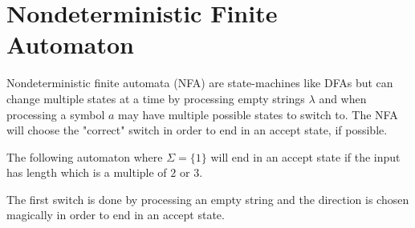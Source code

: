 \documentclass{article}
\newcommand{\emptyString}{\lambda}
\begin{document}
\pagebreak

\section{Nondeterministic Finite Automaton}

Nondeterministic finite automata (NFA) are state-machines
like DFAs but can change multiple states at a time by processing
empty strings \(\emptyString\) and when processing a symbol
\(a\) may have multiple possible states to switch to.
The NFA will choose the "correct" switch in order to end in an accept state, if possible.

The following automaton where \(\Sigma = \{1\}\) will end in an accept state
if the input has length which is a multiple of \(2\) or \(3\).

\newcommand\double[3][10]{%
  \draw (#2)
    edge [bend left=#1,draw=none]
    coordinate[at start](#2-#3-s)
    coordinate[at end](#2-#3-e)
    (#3)
    edge [bend right=#1,draw=none]
    coordinate[at start](#3-#2-e)
    coordinate[at end](#3-#2-s)
    (#3);
}

\begin{center}
\end{center}
The first switch is done by processing an empty string and the direction is chosen magically
in order to end in an accept state.
\end{document}
